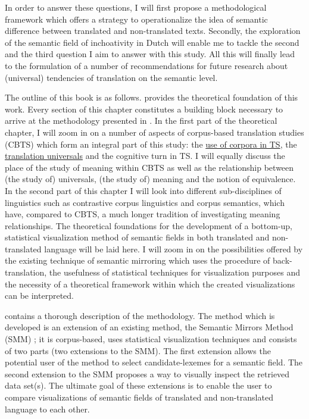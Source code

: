 In order to answer these questions, I will first propose a methodological framework which offers a strategy to operationalize the idea of semantic difference between translated and non-translated texts. Secondly, the exploration of the semantic field of inchoativity in Dutch will enable me to tackle the second and the third question I aim to answer with this study. All this will finally lead to the formulation of a number of recommendations for future research about (universal) tendencies of translation on the semantic level.

The outline of this book is as follows.  provides the theoretical foundation of this work. Every section of this chapter constitutes a building block necessary to arrive at the methodology presented in . In the first part of the theoretical chapter, I will zoom in on a number of aspects of corpus-based translation studies (CBTS) which form an integral part of this study: the \hyperlink{Corpora}{use of corpora in TS}, the \hyperlink{Bakersuniversals}{translation universals} and the cognitive turn in TS. I will equally discuss the place of the study of meaning within CBTS as well as the relationship between (the study of) universals, (the study of) meaning and the notion of equivalence. In the second part of this chapter I will look into different sub-disciplines of linguistics such as contrastive corpus linguistics and corpus semantics, which have, compared to CBTS, a much longer tradition of investigating meaning relationships. The theoretical foundations for the development of a bottom-up, statistical visualization method of semantic fields in both translated and non-translated language will be laid here. I will zoom in on the possibilities offered by the existing technique of semantic mirroring which uses the procedure of back-translation, the usefulness of statistical techniques for visualization purposes and the necessity of a theoretical framework within which the created visualizations can be interpreted.

 contains a thorough description of the methodology. The method which is developed is an extension of an existing method, the Semantic Mirrors Method (SMM) \citep{johansson_translational_1998, aijmer_translations_2004, langemets_translations_2005}; it is corpus-based, uses statistical visualization techniques and consists of two parts (two extensions to the SMM). The first extension allows the potential user of the method to select candidate-lexemes for a semantic field. The second extension to the SMM proposes a way to visually inspect the retrieved data set(s). The ultimate goal of these extensions is to enable the user to compare visualizations of semantic fields of translated and non-translated language to each other.

